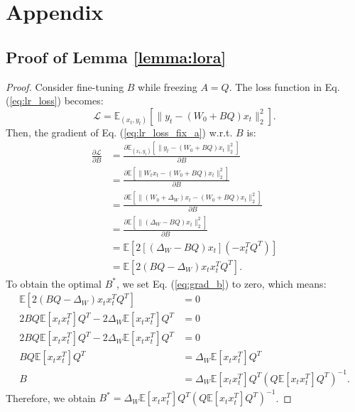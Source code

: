 \appendix
\clearpage
\section{Appendix}

\subsection{Proof of Lemma \ref{lemma:lora}} \label{sec:proof_lemma}

\begin{proof}
    Consider fine-tuning $B$ while freezing $A = Q$. The loss function in Eq. (\ref{eq:lr_loss}) becomes: 
    \begin{equation} \label{eq:lr_loss_fix_a}
        \mathcal{L} = \mathbb{E}_{(x_{t}, y_{t})}[\|y_{t} - (W_0 + BQ) x_{t} \|_2^2].
    \end{equation}
Then, the gradient of Eq. (\ref{eq:lr_loss_fix_a}) w.r.t. $B$ is:
\begin{equation} \label{eq:grad_b}
\begin{aligned}
    \frac{\partial \mathcal{L}}{\partial B} &=  \frac{\partial \mathbb{E}_{(x_{t}, y_{t})}[\|y_{t} - (W_0 + BQ) x_{t} \|_2^2]}{\partial B} \\
    &= \frac{\partial \mathbb{E}[\|W_tx_t - (W_0 + BQ) x_{t} \|_2^2]}{\partial B} \\
    &= \frac{\partial \mathbb{E}[\|(W_0 + \Delta_W)x_t - (W_0 + BQ) x_{t} \|_2^2]}{\partial B} \\
    &= \frac{\partial \mathbb{E}[\|(\Delta_W - BQ)x_t \|_2^2]}{\partial B} \\
    &= \mathbb{E}[2[(\Delta_W - BQ)x_t] (-x_t^T Q^T)] \\
    &= \mathbb{E}[2(BQ - \Delta_W) x_{t}x_t^T Q^T].
\end{aligned}
\end{equation}
To obtain the optimal $B^*$, we set Eq. (\ref{eq:grad_b}) to zero, which means:
\begin{equation}
\begin{aligned}
    \mathbb{E}[2(BQ - \Delta_W) x_{t}x_t^T Q^T] &= 0 \\
    2BQ\mathbb{E}[x_tx_t^T]Q^T - 2\Delta_W\mathbb{E}[x_tx_t^T]Q^T &= 0 \\
    2BQ\mathbb{E}[x_tx_t^T]Q^T - 2\Delta_W\mathbb{E}[x_tx_t^T]Q^T &= 0 \\
    BQ\mathbb{E}[x_tx_t^T]Q^T &= \Delta_W\mathbb{E}[x_tx_t^T]Q^T  \\
    B &= \Delta_W\mathbb{E}[x_tx_t^T]Q^T (Q\mathbb{E}[x_tx_t^T]Q^T)^{-1}.
\end{aligned}
\end{equation}
Therefore, we obtain $B^*= \Delta_W\mathbb{E}[x_tx_t^T]Q^T (Q\mathbb{E}[x_tx_t^T]Q^T)^{-1}$.


\end{proof}
